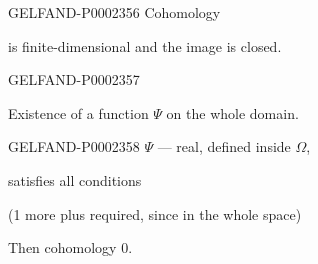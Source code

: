 \begin{GelfandAdjacentEvidence}{GELFAND-P000235}{6}
Cohomology 

is finite-dimensional and the image is closed.
\end{GelfandAdjacentEvidence}
\begin{GelfandAdjacentEvidence}{GELFAND-P000235}{7}
 



\end{GelfandAdjacentEvidence}

Existence of a function $\Psi$ on the whole domain.



\begin{GelfandAdjacentEvidence}{GELFAND-P000235}{8}
$\Psi$ — real, defined inside $\Omega$,



\end{GelfandAdjacentEvidence}

satisfies all conditions



(1 more plus required, since in the whole space)



Then cohomology 0.





